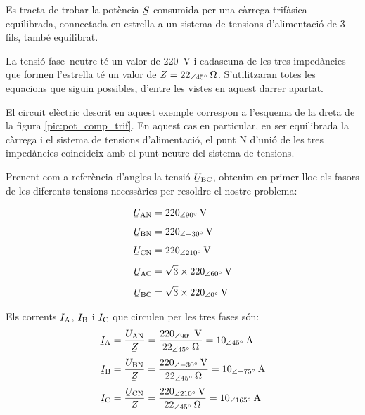 \begin{exemple}\label{ex:calc-pot}
    Es tracta de trobar la potència $\cmplx{S}$ consumida per una càrrega
    trifàsica equilibrada, connectada en estrella a un sistema de tensions
    d'alimentació  de 3 fils, també equilibrat.

    La tensió fase--neutre
    té un valor de \SI{220}{V} i cadascuna de les tres  impedàncies
    que formen l'estrella té un valor de $\cmplx{Z}=\SIpd{22}{45}{\ohm}$.
     S'utilitzaran totes les equacions que
    siguin possibles, d'entre les vistes en aquest darrer apartat.

    El circuit elèctric descrit en aquest exemple  correspon a
    l'esquema de la dreta de la figura \vref{pic:pot_comp_trif}. En
    aquest cas en particular, en ser equilibrada la càrrega i el
    sistema de tensions d'alimentació, el punt N d'unió de  les tres impedàncies coincideix amb el punt neutre del sistema de tensions.

    Prenent com a referència d'angles la tensió
    $\cmplx{U}\ped{BC}$, obtenim en primer lloc els fasors de
    les diferents tensions necessàries per resoldre el nostre
    problema:

    \hfill
    \begin{minipage}[b]{7.5cm}
        
    \end{minipage}
    \hfill
    \begin{minipage}[b][5.7cm][t]{3.8cm}
    \begin{align*}
        \cmplx{U}\ped{AN} &= \SIpd{220}{90}{V} \\[1ex]
        \cmplx{U}\ped{BN} &= \SIpd{220}{-30}{V} \\[1ex]
        \cmplx{U}\ped{CN} &= \SIpd{220}{210}{V} \\[1ex]
        \cmplx{U}\ped{AC} &= \sqrt{3}\times \SIpd{220}{60}{V} \\[1ex]
        \cmplx{U}\ped{BC} &= \sqrt{3}\times \SIpd{220}{0}{V}
    \end{align*}
    \end{minipage}
    \hfill{}

    Els corrents $\cmplx{I}\ped{A}$, $\cmplx{I}\ped{B}$ i $\cmplx{I}\ped{C}$ que
    circulen  per les tres fases són:
    \begin{align*}
        \cmplx{I}\ped{A} &=\frac{\cmplx{U}\ped{AN}}{\cmplx{Z}} =
        \frac{\SIpd{220}{90}{V}}{\SIpd{22}{45}{\ohm}} =
        \SIpd{10}{45}{A}\\[1mm]
        \cmplx{I}\ped{B} &=\frac{\cmplx{U}\ped{BN}}{\cmplx{Z}} =
        \frac{\SIpd{220}{-30}{V}}{\SIpd{22}{45}{\ohm}} =
        \SIpd{10}{-75}{A}\\[1mm]
        \cmplx{I}\ped{C} &=\frac{\cmplx{U}\ped{CN}}{\cmplx{Z}} =
        \frac{\SIpd{220}{210}{V}}{\SIpd{22}{45}{\ohm}} =
        \SIpd{10}{165}{A}
    \end{align*}



\end{exemple}
